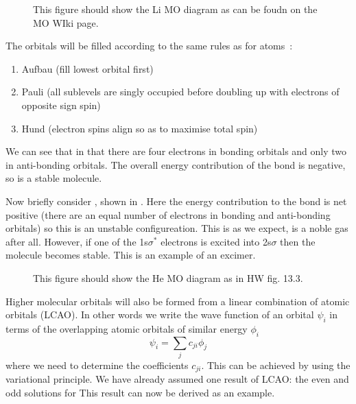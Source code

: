 \begin{figure}
  \caption{This figure should show the Li MO diagram as can be foudn on the MO
  WIki page.}
  \label{diaspec:fig:LiMO}
\end{figure}

The orbitals will be filled according to the same rules as for atoms~\cite{}:
%
\begin{enumerate}
  \item Aufbau (fill lowest orbital first)
  \item Pauli (all sublevels are singly occupied before doubling up with
    electrons of opposite sign spin)
  \item Hund (electron spins align so as to maximise total spin)
\end{enumerate}
%
We can see that in  that there are four electrons in bonding orbitals
and only two in anti-bonding orbitals. The overall energy contribution of the
bond is negative, so   is a stable molecule.

Now briefly consider , shown in . Here the
energy contribution to the bond is net positive (there are an equal number of
electrons in bonding and anti-bonding orbitals) so this is an unstable
configureation. This is as we expect,  is a noble gas after all. However,
if one of the 1s$\sigma^*$ electrons is excited into 2s$\sigma$ then the
 molecule becomes stable. This is an example of an excimer.

\begin{figure}
  \caption{This figure should show the He MO diagram as in HW fig. 13.3.}
  \label{diaspec:fig:HeMO}
\end{figure}

Higher molecular orbitals will also be formed from a linear combination of
atomic orbitals (LCAO). In other words we write the wave function of an orbital
$\psi_i$ in terms of the overlapping atomic orbitals of similar energy $\phi_i$
%
\begin{equation}
  \psi_i = \sum_j c_{ji} \phi_j
\end{equation}
%
where we need to determine the coefficients $c_{ji}$. This can be achieved by
using the variational principle. We have already assumed one result of LCAO: the
even and odd solutions for   This result can now be
derived as an example.


